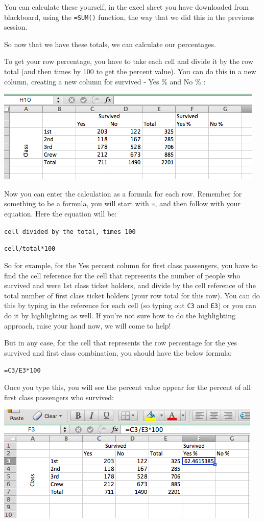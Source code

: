 \documentclass[
]{book}
\begin{document}
You can calculate these yourself, in the excel sheet you have downloaded from blackboard, using the \texttt{=SUM()} function, the way that we did this in the previous session.

So now that we have these totals, we can calculate our percentages.

To get your row percentage, you have to take each cell and divide it by the row total (and then times by 100 to get the percent value). You can do this in a new column, creating a new column for survived - Yes \% and No \% :

\includegraphics{imgs/surv_perc_cols.png}

Now you can enter the calculation as a formula for each row. Remember for something to be a formula, you will start with \texttt{=}, and then follow with your equation. Here the equation will be:

\texttt{cell\ divided\ by\ the\ total,\ times\ 100}

\texttt{cell/total*100}

So for example, for the Yes percent column for first class passengers, you have to find the cell reference for the cell that represents the number of people who survived and were 1st class ticket holders, and divide by the cell reference of the total number of first class ticket holders (your row total for this row). You can do this by typing in the reference for each cell (so typing out \texttt{C3} and \texttt{E3}) or you can do it by highlighting as well. If you're not sure how to do the highlighting approach, raise your hand now, we will come to help!

But in any case, for the cell that represents the row percentage for the yes survived and first class combination, you should have the below formula:

\texttt{=C3/E3*100}

Once you type this, you will see the percent value appear for the percent of all first class passengers who survived:

\includegraphics{imgs/perc_surv_value.png}
\end{document}
